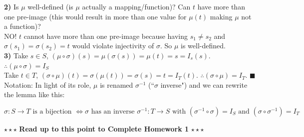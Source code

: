 \begin{lemma}
\noindent\textbf{2)} Is $\mu$ well-defined (is $\mu$ actually a mapping/function)? Can $t$ have more than one pre-image (this would result in more than one value for $\mu(t)$ making $\mu$ not a function)?\steezybreak\\
NO! $t$ cannot have more than one pre-image because having $s_1\neq s_2$ and $\sigma(s_1)=\sigma(s_2)=t$ would violate injectivity of $\sigma$. So $\mu$ is well-defined.\steezybreak\\

\noindent\textbf{3)} Take $s\in S$, $(\mu\circ \sigma)(s)=\mu(\sigma(s))=\mu(t)=s=I_s(s)$. $\therefore (\mu\circ \sigma)= I_S$\steezybreak\\

Take $t\in T$, $(\sigma\circ \mu)(t)= \sigma(\mu(t))=\sigma(s)=t=I_T(t)$. $\therefore (\sigma\circ \mu) = I_T$. $\blacksquare$ \steezybreak\\

\noindent Notation: In light of its role, $\mu$ is renamed $\sigma^{-1}$ (``$\sigma$ inverse") and we can rewrite the lemma like this:

\begin{equation}
    \sigma:S\rightarrow T \text{ is a bijection } \iff \sigma \text{ has an inverse } \sigma^{-1}: T\rightarrow S \text{ with } (\sigma^{-1}\circ \sigma)= I_S \text{ and } (\sigma \circ \sigma^{-1})=I_T\nonumber
\end{equation}
\end{lemma}\steezybreak
\begin{tcolorbox}
\begin{center}
    $\star\star\star$ \textbf{Read up to this point to Complete Homework 1} $\star\star\star$
\end{center}
\end{tcolorbox}
\steezybreak
